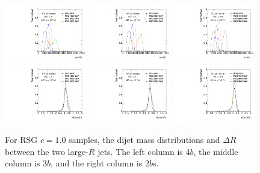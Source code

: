 \begin{figure}[htbp!]
\begin{center}
\includegraphics[angle=270, width=0.32\textwidth]{./figures/boosted/Truth/Moriond_comp_0_FourTag_Signal_mHH_l.pdf}
\includegraphics[angle=270, width=0.32\textwidth]{./figures/boosted/Truth/Moriond_comp_0_ThreeTag_Signal_mHH_l.pdf}
\includegraphics[angle=270, width=0.32\textwidth]{./figures/boosted/Truth/Moriond_comp_0_TwoTag_split_Signal_mHH_l.pdf}\\
\includegraphics[angle=270, width=0.32\textwidth]{./figures/boosted/Truth/Moriond_comp_0_FourTag_Signal_hCandDr.pdf}
\includegraphics[angle=270, width=0.32\textwidth]{./figures/boosted/Truth/Moriond_comp_0_ThreeTag_Signal_hCandDr.pdf}
\includegraphics[angle=270, width=0.32\textwidth]{./figures/boosted/Truth/Moriond_comp_0_TwoTag_split_Signal_hCandDr.pdf}\\
\caption{For RSG $c=1.0$ samples, the dijet mass distributions and $\Delta R$ between the two large-$R$ jets. The left column is 4$b$, the middle column is 3$b$, and the right column is 2$b$s.}
\label{fig:app-signal-jj}
\end{center}
\end{figure}


